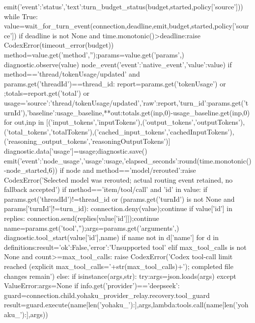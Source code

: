         emit({'event':'status','text':turn_budget_status(budget,started,policy['source'])})
        while True:
            value=wait_for_turn_event(connection,deadline,emit,budget,started,policy['source'])
            if deadline is not None and time.monotonic()>deadline:raise CodexError(timeout_error(budget))
            method=value.get('method','');params=value.get('params',{})
            diagnostic.observe(value)
            node_event({'event':'native_event','value':value})
            if method=='thread/tokenUsage/updated' and params.get('threadId')==thread_id:
                report=params.get('tokenUsage') or {};totals=report.get('total') or {}
                usage={'source':'thread/tokenUsage/updated','raw':report,'turn_id':params.get('turnId'),'baseline':usage_baseline,**{out:totals.get(inp,0)-usage_baseline.get(inp,0) for out,inp in [('input_tokens','inputTokens'),('output_tokens','outputTokens'),('total_tokens','totalTokens'),('cached_input_tokens','cachedInputTokens'),('reasoning_output_tokens','reasoningOutputTokens')]}}
                diagnostic.data['usage']=usage;diagnostic.save()
                emit({'event':'node_usage','usage':usage,'elapsed_seconds':round(time.monotonic()-node_started,6)})
            if node and method=='model/rerouted':raise CodexError('Selected model was rerouted; actual routing event retained, no fallback accepted')
            if method=='item/tool/call' and 'id' in value:
                if params.get('threadId')!=thread_id or (params.get('turnId') is not None and params['turnId']!=turn_id):
                    connection.deny(value);continue
                if value['id'] in replies:
                    connection.send(replies[value['id']]);continue
                name=params.get('tool','');args=params.get('arguments',{})
                diagnostic.tool_start(value['id'],name)
                if name not in {d['name'] for d in definitions}:result={'ok':False,'error':'Unsupported tool'}
                elif max_tool_calls is not None and count>=max_tool_calls:
                    raise CodexError('Codex tool-call limit reached (explicit max_tool_calls='+str(max_tool_calls)+'); completed file changes remain')
                else:
                    if isinstance(args,str):
                        try:args=json.loads(args)
                        except ValueError:args=None
                    if info.get('provider')=='deepseek':
                        guard=connection.child.yohaku_provider_relay.recovery.tool_guard
                        result=guard.execute(name[len('yohaku_'):],args,lambda:tools.call(name[len('yohaku_'):],args))
